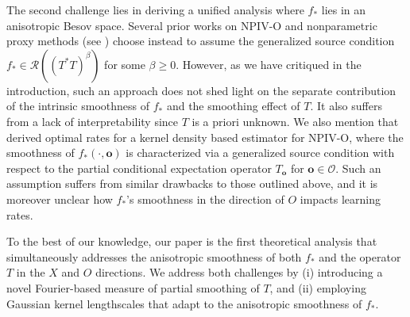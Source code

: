 \documentclass[11pt]{article}
\newcommand{\bo}{\mathbf o}
\newcommand{\calO}{\mathcal{O}}
\newcommand{\0}{\mathbf{0}}
\begin{document}
The second challenge lies in deriving a unified analysis where $f_{\ast}$ lies in an anisotropic Besov space. 
Several prior works on NPIV-O 
and nonparametric proxy methods 
(see ) \citet{singh2019kernel, mastouri2021proximal, singh2023kernel, bozkurt2025densityratiobasedproxycausal,HallHorowitz2005,bozkurt2025density} choose instead to assume the generalized source condition $f_{\ast}\in \mathcal{R}((T^{\ast}T)^{\beta})$ for some $\beta\geq 0$. However, as we have critiqued in the introduction, such an approach does not shed light on the separate contribution of the intrinsic smoothness of $f_{\ast}$ and the smoothing effect of $T$. It also suffers from a lack of interpretability since $T$ is a priori unknown. We also mention that \citet{HallHorowitz2005} derived optimal rates for a kernel density based estimator for NPIV-O, where the smoothness of $f_{\ast}(\cdot, \bo)$ is characterized via a generalized source condition with respect to the partial conditional expectation operator $T_{\bo}$ \citep[Section 4.3]{HallHorowitz2005} for $\bo\in\calO$. Such an assumption suffers from similar drawbacks to those outlined above, and it is moreover unclear how $f_{\ast}$'s smoothness in the direction of $O$ impacts learning rates. 


To the best of our knowledge, our paper is the first theoretical analysis that simultaneously addresses the anisotropic smoothness of both $f_\ast$ and the operator $T$ in the $X$ and $O$ directions. We address both challenges by (i) introducing a novel Fourier-based measure of partial smoothing of $T$, and (ii) employing Gaussian kernel lengthscales that adapt to the anisotropic smoothness of $f_\ast$.
\end{document}
